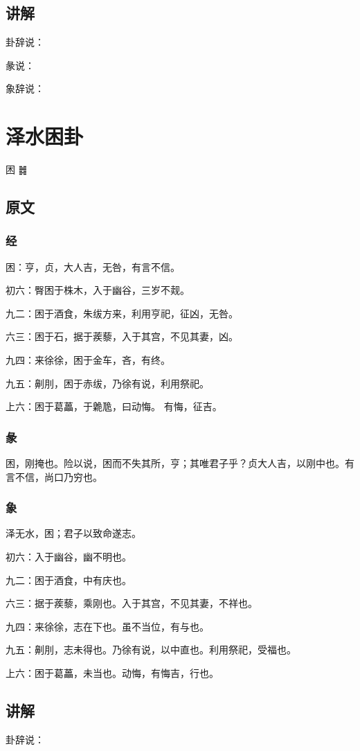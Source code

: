 \documentclass[12pt,oneside]{book}
\begin{document}
\section{讲解}
卦辞说：

彖说：

象辞说：

\chapter{泽水困卦}
困 {\Large ䷮}

\section{原文}

\subsection{经}
困：亨，贞，大人吉，无咎，有言不信。

初六：臀困于株木，入于幽谷，三岁不觌。

九二：困于酒食，朱绂方来，利用亨祀，征凶，无咎。

六三：困于石，据于蒺藜，入于其宫，不见其妻，凶。

九四：来徐徐，困于金车，吝，有终。

九五：劓刖，困于赤绂，乃徐有说，利用祭祀。

上六：困于葛藟，于臲卼，曰动悔。 有悔，征吉。

\subsection{彖}
困，刚掩也。险以说，困而不失其所，亨；其唯君子乎？贞大人吉，以刚中也。有言不信，尚口乃穷也。

\subsection{象}
泽无水，困；君子以致命遂志。

初六：入于幽谷，幽不明也。

九二：困于酒食，中有庆也。

六三：据于蒺藜，乘刚也。入于其宫，不见其妻，不祥也。

九四：来徐徐，志在下也。虽不当位，有与也。

九五：劓刖，志未得也。乃徐有说，以中直也。利用祭祀，受福也。

上六：困于葛藟，未当也。动悔，有悔吉，行也。

\section{讲解}
卦辞说：
\end{document}
